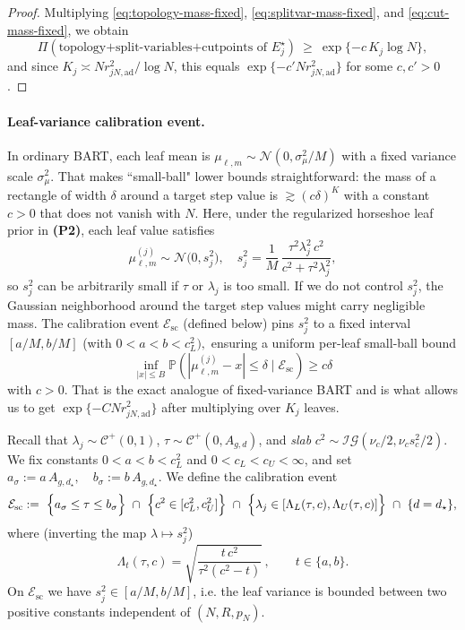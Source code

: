 \documentclass[11pt]{article}
\theoremstyle{plain}
\theoremstyle{definition}
\theoremstyle{plain}
\begin{document}
\begin{proof}
Multiplying \eqref{eq:topology-mass-fixed}, \eqref{eq:splitvar-mass-fixed}, and \eqref{eq:cut-mass-fixed}, we obtain
\[
\Pi(\text{topology+split-variables+cutpoints of }E_j^\star)
\ \ge\ \exp\{-c\,K_j\log N\},
\]
and since $K_j\asymp N r_{jN,\mathrm{ad}}^2/\log N$, this equals $\exp\{-c' N r_{jN,\mathrm{ad}}^2\}$ for some $c,c'>0$.
\end{proof}

\paragraph{Leaf-variance calibration event.}
In ordinary BART, each leaf mean is $\mu_{\ell,m} \sim \mathcal{N}(0,\sigma_{\mu} ^2/M)$ with a fixed variance scale $\sigma_{\mu} ^2$. That makes ``small-ball" lower bounds straightforward: the mass of a rectangle of width $\delta$ around a target step value is $\gtrsim (c\delta)^K$ with a constant $c>0$ that does not vanish with $N$. Here, under the regularized horseshoe leaf prior in {\textbf{(P2)}}, each leaf value satisfies
\[
\mu^{(j)}_{\ell,m} \sim \mathcal N\Big(0,s_j^2\Big),
\quad
s_j^2 =\frac{1}{M}\,\frac{\tau^2\lambda_j^2\,c^2}{c^2+\tau^2\lambda_j^2},
\]
so $s_j ^2$ can be arbitrarily small if $\tau$ or $\lambda_j$ is too small. If we do not control $s_j ^2$, the Gaussian neighborhood around the target step values might carry negligible mass. The calibration event $\mathcal{E}_{\textrm{sc}}$ (defined below) pins $s_j ^2$ to a fixed interval $[a/M,b/M]$ (with $0<a<b<c_L ^2),$ ensuring a uniform per-leaf small-ball bound \[
\inf_{|x| \le B} \mathbb{P} \left(| \mu_{\ell,m}^{(j)} - x| \le \delta \mid \mathcal{E}_{\textrm{sc}} \right) \ge c \delta
\]
with $c>0$. That is the exact analogue of fixed-variance BART and is what allows us to get $\exp \{-CNr_{jN,\textrm{ad}}^2\}$ after multiplying over $K_j$ leaves.

Recall that $\lambda_j\sim\mathcal C^+(0,1)$, $\tau\sim\mathcal C^+(0,A_{g,d})$, and \emph{slab} $c^2\sim\mathcal{IG}(\nu_c/2,\nu_c s_c^2/2)$. We fix constants $0<a<b<c_L^2$ and $0<c_L<c_U<\infty$, and set
\(
a_\sigma:=a\,A_{g,d_\star},\quad b_\sigma:=b\,A_{g,d_\star}.
\)
We define the calibration event
\[
\mathcal E_{\mathrm{sc}}
:=\ \Bigl\{a_\sigma\le \tau \le b_\sigma\Bigr\}
 \ \cap\ \Bigl\{c^2\in[c_L^2,c_U^2]\Bigr\}
 \ \cap\ \Bigl\{\lambda_j\in[\Lambda_L(\tau,c),\Lambda_U(\tau,c)]\Bigr\}
 \ \cap\ \{d=d_\star\},
\]
where (inverting the map $\lambda\mapsto s_j^2$)
\[
\Lambda_t(\tau,c)
=\sqrt{\frac{t\,c^2}{\tau^2(c^2-t)}}\,,\qquad t\in\{a,b\}.
\]
On $\mathcal E_{\mathrm{sc}}$ we have $s_j^2\in[a/M,b/M]$, i.e. the leaf variance is bounded between two positive constants independent of $(N,R,p_N)$.
\end{document}

